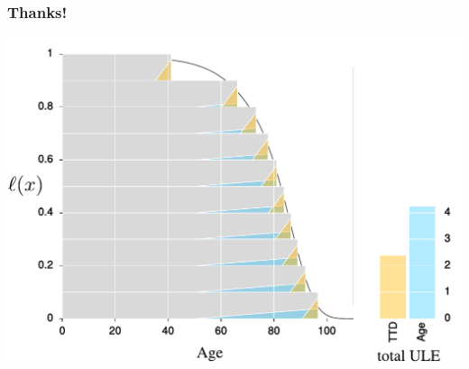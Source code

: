 \documentclass[20pt]{beamer}
\begin{document}
\begin{frame}
\frametitle{Thanks!}
\begin{center}
\includegraphics[width=\linewidth]{Figures/Japan2010.pdf}
\end{center}
\end{frame}

\end{document}
